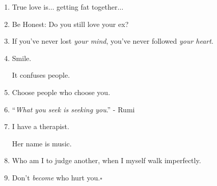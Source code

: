 \documentclass{article}
\numberwithin{equation}{section}
\begin{document}
\begin{enumerate}
    Because in life, there are no rewinds$\ldots$
    \item True love is$\ldots$ getting fat together$\ldots$
    \item Be Honest: Do you still love your ex?
    \item If you've never lost \textit{your mind}, you've never followed \textit{your heart}.
    \item Smile.
    
    It confuses people.
    \item Choose people who choose you.
    \item ``\textit{What you seek is seeking you}.'' - Rumi
    \item I have a therapist.
    
    Her name is music.
    \item Who am I to judge another, when I myself walk imperfectly.
    \item Don't \textit{become} who hurt you.\hfill$\square$
\end{enumerate}


\printbibliography[heading=bibintoc]
\end{document}

